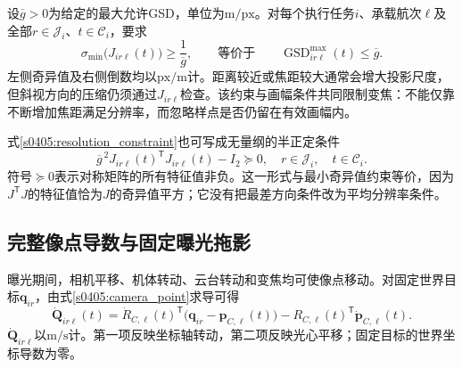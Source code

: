 设$\overline g>0$为给定的最大允许GSD，单位为$\mathrm{m/px}$。对每个执行任务$i$、承载航次$\ell$及全部$r\in\mathcal J_i$、$t\in\mathcal C_i$，要求
\begin{equation}
 \sigma_{\min}\bigl(J_{ir\ell}(t)\bigr)
 \ge\frac{1}{\overline g},
 \qquad\text{等价于}\qquad
 \operatorname{GSD}^{\max}_{ir\ell}(t)\le\overline g.
 \label{s0405:resolution_constraint}
\end{equation}
左侧奇异值及右侧倒数均以$\mathrm{px/m}$计。距离较近或焦距较大通常会增大投影尺度，但斜视方向的压缩仍须通过$J_{ir\ell}$检查。该约束与画幅条件共同限制变焦：不能仅靠不断增加焦距满足分辨率，而忽略样点是否仍留在有效画幅内。

式\eqref{s0405:resolution_constraint}也可写成无量纲的半正定条件
\begin{equation}
 \overline g^{\,2}J_{ir\ell}(t)^{\mathsf T}J_{ir\ell}(t)-I_2\succeq0,
 \quad r\in\mathcal J_i,\quad t\in\mathcal C_i.
 \label{s0405:resolution_psd}
\end{equation}
符号$\succeq0$表示对称矩阵的所有特征值非负。这一形式与最小奇异值约束等价，因为$J^{\mathsf T}J$的特征值恰为$J$的奇异值平方；它没有把最差方向条件改为平均分辨率条件。

\subsection{完整像点导数与固定曝光拖影}

曝光期间，相机平移、机体转动、云台转动和变焦均可使像点移动。对固定世界目标$\mathbf q_{ir}$，由式\eqref{s0405:camera_point}求导可得
\begin{equation}
 \dot{\mathbf Q}_{ir\ell}(t)
 =\dot R_{C,\ell}(t)^{\mathsf T}
   \bigl(\mathbf q_{ir}-\mathbf p_{C,\ell}(t)\bigr)
 -R_{C,\ell}(t)^{\mathsf T}\dot{\mathbf p}_{C,\ell}(t).
 \label{s0405:camera_point_rate}
\end{equation}
$\dot{\mathbf Q}_{ir\ell}$以$\mathrm{m/s}$计。第一项反映坐标轴转动，第二项反映光心平移；固定目标的世界坐标导数为零。

